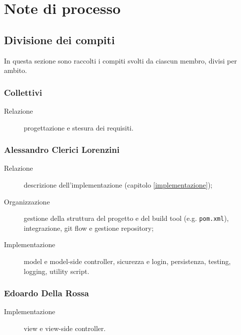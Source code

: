 \chapter{Note di processo}




\section{Divisione dei compiti}
In questa sezione sono raccolti i compiti svolti da ciascun membro, divisi per ambito.


\subsection{Collettivi}
\begin{description}
	\item[Relazione] progettazione e stesura dei requisiti.
\end{description}


\subsection{Alessandro Clerici Lorenzini}
\begin{description}
	\item[Relazione] descrizione dell'implementazione (capitolo \ref{implementazione});
	\item[Organizzazione] gestione della struttura del progetto e del build tool (e.g. \verb!pom.xml!), integrazione, git flow e gestione repository;
	\item[Implementazione] model e model-side controller, sicurezza e login, persistenza, testing, logging, utility script.
\end{description}


\subsection{Edoardo Della Rossa}
\begin{description}
	\item[Implementazione] view e view-side controller.
\end{description}
